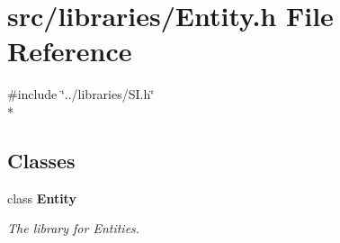 \section{src/libraries/\-Entity.h File Reference}
\label{_entity_8h}
{\ttfamily \#include \char`\"{}../libraries/\-S\-I.\-h\char`\"{}}\\*
\subsection*{Classes}
\begin{DoxyCompactItemize}
\item 
class {\bf Entity}
\begin{DoxyCompactList}\small\item\em The library for Entities. \end{DoxyCompactList}\end{DoxyCompactItemize}
